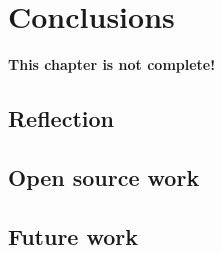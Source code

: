 
\chapter{Conclusions}
\label{ch:conclusions} %

\textbf{This chapter is not complete!}



\section{Reflection}
\label{sec:reflection} %

\section{Open source work}
\label{sec:open-source-work} %



\section{Future work}
\label{sec:future-work} %


